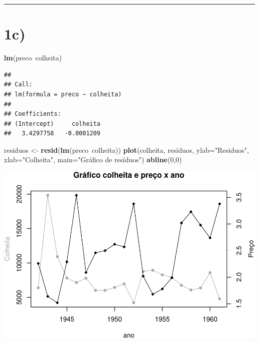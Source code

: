 \documentclass[11pt,]{article}
\makeatletter
\newenvironment{Shaded}{\begin{snugshade}}{\end{snugshade}}
\newcommand{\KeywordTok}[1]{\textcolor[rgb]{0.13,0.29,0.53}{\textbf{{#1}}}}
\newcommand{\DataTypeTok}[1]{\textcolor[rgb]{0.13,0.29,0.53}{{#1}}}
\newcommand{\DecValTok}[1]{\textcolor[rgb]{0.00,0.00,0.81}{{#1}}}
\newcommand{\StringTok}[1]{\textcolor[rgb]{0.31,0.60,0.02}{{#1}}}
\newcommand{\NormalTok}[1]{{#1}}
\def\maxwidth{\ifdim\Gin@nat@width>\linewidth\linewidth
\else\Gin@nat@width\fi}
\let\Oldincludegraphics\includegraphics
\renewcommand{\includegraphics}[1]{\Oldincludegraphics[width=\maxwidth]{#1}}
\makeatother
\begin{document}
\begin{center}\rule{0.5\linewidth}{\linethickness}\end{center}

\section{1c)}\label{c}

\begin{Shaded}
\begin{Highlighting}[]
\KeywordTok{lm}\NormalTok{(preco~colheita)}
\end{Highlighting}
\end{Shaded}

\begin{verbatim}
## 
## Call:
## lm(formula = preco ~ colheita)
## 
## Coefficients:
## (Intercept)     colheita  
##   3.4297758   -0.0001209
\end{verbatim}

\begin{Shaded}
\begin{Highlighting}[]
\NormalTok{residuos <-}\StringTok{ }\KeywordTok{resid}\NormalTok{(}\KeywordTok{lm}\NormalTok{(preco~colheita))}
\KeywordTok{plot}\NormalTok{(colheita, residuos,}
     \DataTypeTok{ylab=}\StringTok{"Residuos"}\NormalTok{,}
     \DataTypeTok{xlab=}\StringTok{"Colheita"}\NormalTok{,}
     \DataTypeTok{main=}\StringTok{"Gráfico de resíduos"}\NormalTok{) }
\KeywordTok{abline}\NormalTok{(}\DecValTok{0}\NormalTok{,}\DecValTok{0}\NormalTok{)}
\end{Highlighting}
\end{Shaded}

\includegraphics{versaofinal_lista3_files/figure-latex/unnamed-chunk-5-1.pdf}
\end{document}
